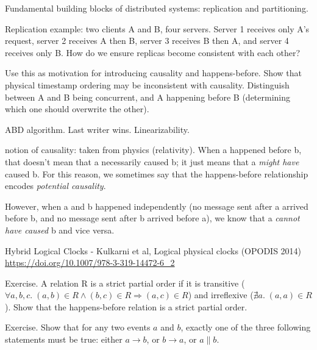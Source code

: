 Fundamental building blocks of distributed systems: replication and partitioning.

Replication example: two clients A and B, four servers. Server 1 receives only A's request,
server 2 receives A then B, server 3 receives B then A, and server 4 receives only B.
How do we ensure replicas become consistent with each other?

Use this as motivation for introducing causality and happens-before.
Show that physical timestamp ordering may  be inconsistent with causality.
Distinguish between A and B being concurrent, and A happening before B
(determining which one should overwrite the other).

ABD algorithm. Last writer wins. Linearizability.

notion of causality: taken from physics (relativity).
When a happened before b, that doesn't mean that a necessarily caused b; it just means that a \emph{might have} caused b.
For this reason, we sometimes say that the happens-before relationship encodes \emph{potential causality}.

However, when a and b happened independently (no message sent after a arrived before b, and no message sent after b arrived before a), we know that a \emph{cannot have caused} b and vice versa.

Hybrid Logical Clocks - Kulkarni et al, Logical physical clocks (OPODIS 2014) \url{https://doi.org/10.1007/978-3-319-14472-6_2}

Exercise. A relation R is a strict partial order if it is transitive ($\forall a,b,c.\; (a,b) \in R \wedge (b,c) \in R \Longrightarrow (a,c) \in R$) and irreflexive ($\nexists a.\; (a,a) \in R$). Show that the happens-before relation is a strict partial order.

Exercise. Show that for any two events $a$ and $b$, exactly one of the three following statements must be true: either $a \rightarrow b$, or $b \rightarrow a$, or $a \parallel b$.




{}

